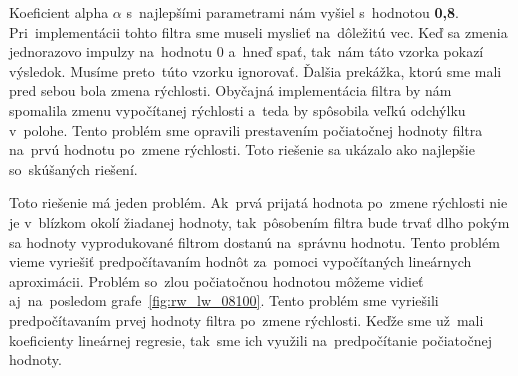 Koeficient alpha $\alpha$ s~najlepšími parametrami nám vyšiel s~hodnotou \textbf{0,8}. Pri~implementácii tohto filtra
sme museli myslieť na~dôležitú vec. Keď sa zmenia jednorazovo impulzy na~hodnotu 0 a~hneď spať, tak~nám táto vzorka
pokazí výsledok. Musíme preto~túto vzorku ignorovať. Ďalšia prekážka, ktorú sme mali pred sebou bola zmena rýchlosti.
Obyčajná implementácia filtra by nám spomalila zmenu vypočítanej rýchlosti a~teda by spôsobila veľkú odchýlku v~polohe.
Tento problém sme opravili prestavením počiatočnej hodnoty filtra na~prvú hodnotu po~zmene rýchlosti. Toto riešenie sa
ukázalo ako najlepšie so~skúšaných riešení.

Toto riešenie má jeden problém. Ak~prvá prijatá hodnota po~zmene rýchlosti nie je v~blízkom okolí žiadanej
hodnoty, tak~pôsobením filtra bude trvať dlho pokým sa hodnoty vyprodukované filtrom dostanú na~správnu hodnotu.
Tento problém vieme vyriešiť predpočítavaním hodnôt za~pomoci vypočítaných lineárnych aproximácii. Problém so~zlou
počiatočnou hodnotou môžeme vidieť aj~na~posledom grafe~\ref{fig:rw_lw_08100}. Tento problém sme vyriešili
predpočítavaním prvej hodnoty filtra po~zmene rýchlosti. Keďže sme už~mali koeficienty lineárnej regresie, tak~sme
ich využili na~predpočítanie počiatočnej hodnoty.

\clearpage

